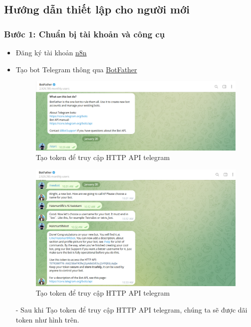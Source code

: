 \subsection{Hướng dẫn thiết lập cho người mới}

\subsubsection{Bước 1: Chuẩn bị tài khoản và công cụ}
\begin{itemize}
    \item Đăng ký tài khoản \href{https://n8n.io}{n8n}
    \item Tạo bot Telegram thông qua \href{https://t.me/botfather}{BotFather}
    
    \begin{figure}[H]
    \centering
    \includegraphics[width=1\textwidth]{images/3thuchi02.png}
    \caption{Tạo token để truy cập HTTP API telegram}
    \end{figure}
    \begin{figure}[H]
    \centering
    \includegraphics[width=1\textwidth]{images/3thuchi03.png}
    \caption{Tạo token để truy cập HTTP API telegram}
    \end{figure}

- Sau khi Tạo token để truy cập HTTP API telegram, chúng ta sẽ được dãi token như hình trên. \\


\end{itemize}
